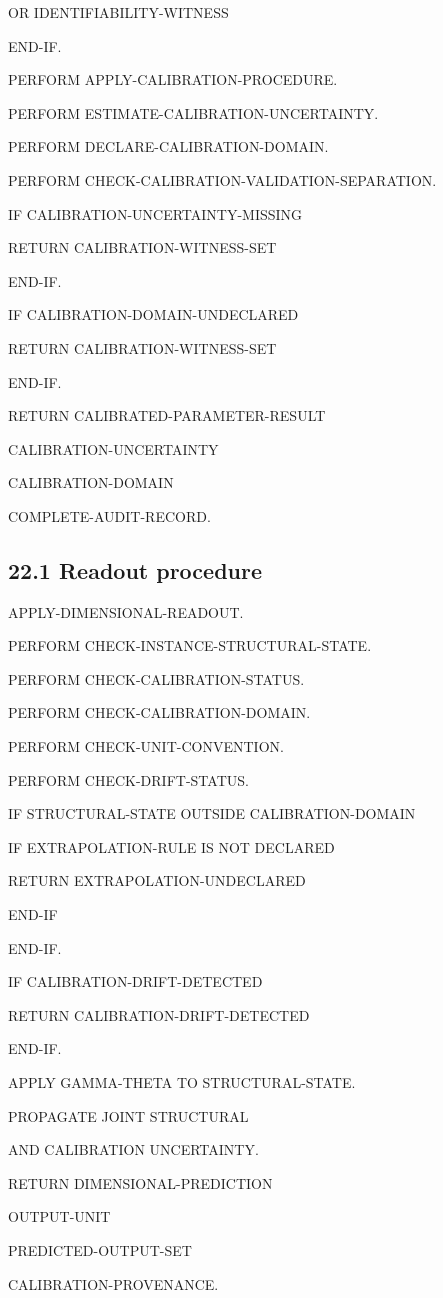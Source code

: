 \documentclass[11pt,oneside,openany]{book}
\newcommand{\PCsubsection}[1]{%
  \subsection*{#1}%
}
\begin{document}
OR IDENTIFIABILITY-WITNESS

END-IF.


PERFORM APPLY-CALIBRATION-PROCEDURE.

PERFORM ESTIMATE-CALIBRATION-UNCERTAINTY.

PERFORM DECLARE-CALIBRATION-DOMAIN.

PERFORM CHECK-CALIBRATION-VALIDATION-SEPARATION.


IF CALIBRATION-UNCERTAINTY-MISSING

RETURN CALIBRATION-WITNESS-SET

END-IF.


IF CALIBRATION-DOMAIN-UNDECLARED

RETURN CALIBRATION-WITNESS-SET

END-IF.


RETURN CALIBRATED-PARAMETER-RESULT

CALIBRATION-UNCERTAINTY

CALIBRATION-DOMAIN

COMPLETE-AUDIT-RECORD.

\PCsubsection{22.1 Readout procedure}

APPLY-DIMENSIONAL-READOUT.


PERFORM CHECK-INSTANCE-STRUCTURAL-STATE.

PERFORM CHECK-CALIBRATION-STATUS.

PERFORM CHECK-CALIBRATION-DOMAIN.

PERFORM CHECK-UNIT-CONVENTION.

PERFORM CHECK-DRIFT-STATUS.


IF STRUCTURAL-STATE OUTSIDE CALIBRATION-DOMAIN

IF EXTRAPOLATION-RULE IS NOT DECLARED

RETURN EXTRAPOLATION-UNDECLARED

END-IF

END-IF.


IF CALIBRATION-DRIFT-DETECTED

RETURN CALIBRATION-DRIFT-DETECTED

END-IF.


APPLY GAMMA-THETA TO STRUCTURAL-STATE.

PROPAGATE JOINT STRUCTURAL

AND CALIBRATION UNCERTAINTY.


RETURN DIMENSIONAL-PREDICTION

OUTPUT-UNIT

PREDICTED-OUTPUT-SET

CALIBRATION-PROVENANCE.
\end{document}
